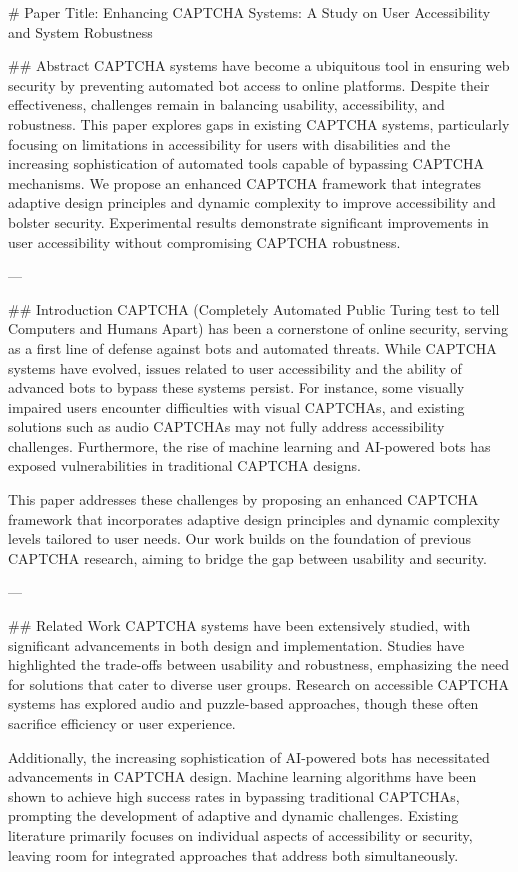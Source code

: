 # Paper Title: Enhancing CAPTCHA Systems: A Study on User Accessibility and System Robustness

## Abstract
CAPTCHA systems have become a ubiquitous tool in ensuring web security by preventing automated bot access to online platforms. Despite their effectiveness, challenges remain in balancing usability, accessibility, and robustness. This paper explores gaps in existing CAPTCHA systems, particularly focusing on limitations in accessibility for users with disabilities and the increasing sophistication of automated tools capable of bypassing CAPTCHA mechanisms. We propose an enhanced CAPTCHA framework that integrates adaptive design principles and dynamic complexity to improve accessibility and bolster security. Experimental results demonstrate significant improvements in user accessibility without compromising CAPTCHA robustness.

---

## Introduction
CAPTCHA (Completely Automated Public Turing test to tell Computers and Humans Apart) has been a cornerstone of online security, serving as a first line of defense against bots and automated threats. While CAPTCHA systems have evolved, issues related to user accessibility and the ability of advanced bots to bypass these systems persist. For instance, some visually impaired users encounter difficulties with visual CAPTCHAs, and existing solutions such as audio CAPTCHAs may not fully address accessibility challenges. Furthermore, the rise of machine learning and AI-powered bots has exposed vulnerabilities in traditional CAPTCHA designs.

This paper addresses these challenges by proposing an enhanced CAPTCHA framework that incorporates adaptive design principles and dynamic complexity levels tailored to user needs. Our work builds on the foundation of previous CAPTCHA research, aiming to bridge the gap between usability and security.

---

## Related Work
CAPTCHA systems have been extensively studied, with significant advancements in both design and implementation. Studies have highlighted the trade-offs between usability and robustness, emphasizing the need for solutions that cater to diverse user groups. Research on accessible CAPTCHA systems has explored audio and puzzle-based approaches, though these often sacrifice efficiency or user experience.

Additionally, the increasing sophistication of AI-powered bots has necessitated advancements in CAPTCHA design. Machine learning algorithms have been shown to achieve high success rates in bypassing traditional CAPTCHAs, prompting the development of adaptive and dynamic challenges. Existing literature primarily focuses on individual aspects of accessibility or security, leaving room for integrated approaches that address both simultaneously.

